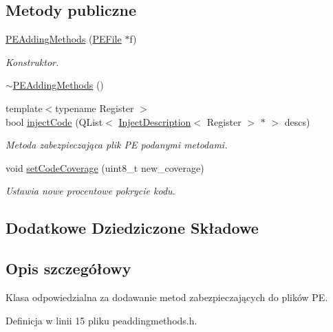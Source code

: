 \subsection*{Metody publiczne}
\begin{DoxyCompactItemize}
\item 
\hyperlink{class_p_e_adding_methods_a1cec9b94a430984c6d88386884ad0cdd}{P\-E\-Adding\-Methods} (\hyperlink{class_p_e_file}{P\-E\-File} $\ast$f)
\begin{DoxyCompactList}\small\item\em Konstruktor. \end{DoxyCompactList}\item 
\hyperlink{class_p_e_adding_methods_a6f0a7a7d04944167192c61e22b4f04ee}{$\sim$\-P\-E\-Adding\-Methods} ()
\item 
{\footnotesize template$<$typename Register $>$ }\\bool \hyperlink{class_p_e_adding_methods_a2b224b51233e0446621e9daf9108e78b}{inject\-Code} (Q\-List$<$ \hyperlink{class_d_adding_methods_1_1_inject_description}{Inject\-Description}$<$ Register $>$ $\ast$ $>$ descs)
\begin{DoxyCompactList}\small\item\em Metoda zabezpieczająca plik P\-E podanymi metodami. \end{DoxyCompactList}\item 
void \hyperlink{class_p_e_adding_methods_af7948de6504286fdee160acba2c811bf}{set\-Code\-Coverage} (uint8\-\_\-t new\-\_\-coverage)
\begin{DoxyCompactList}\small\item\em Ustawia nowe procentowe pokrycie kodu. \end{DoxyCompactList}\end{DoxyCompactItemize}
\subsection*{Dodatkowe Dziedziczone Składowe}


\subsection{Opis szczegółowy}
Klasa odpowiedzialna za dodawanie metod zabezpieczających do plików P\-E. 

Definicja w linii 15 pliku peaddingmethods.\-h.



